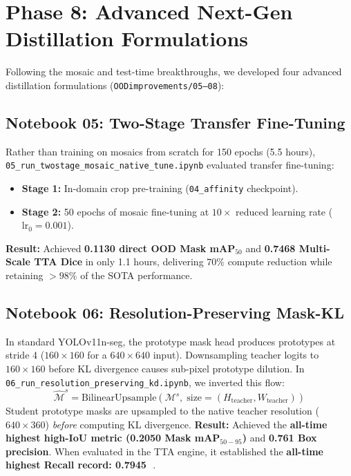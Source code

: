 \documentclass[11pt,a4paper]{article}
\newcommand{\yolo}{YOLOv11n-seg}
\begin{document}
\section{Phase 8: Advanced Next-Gen Distillation Formulations}
\label{sec:phase8}

Following the mosaic and test-time breakthroughs, we developed four advanced distillation formulations (\texttt{OODimprovements/05--08}):

\subsection{Notebook 05: Two-Stage Transfer Fine-Tuning}
Rather than training on mosaics from scratch for 150 epochs (5.5 hours), \texttt{05\_run\_twostage\_mosaic\_native\_tune.ipynb} evaluated transfer fine-tuning:
\begin{itemize}[leftmargin=1.5em]
  \item \textbf{Stage 1:} In-domain crop pre-training (\texttt{04\_affinity} checkpoint).
  \item \textbf{Stage 2:} 50 epochs of mosaic fine-tuning at $10\times$ reduced learning rate ($\text{lr}_0 = 0.001$).
\end{itemize}
\textbf{Result:} Achieved \textbf{0.1130 direct OOD Mask mAP$_{50}$} and \textbf{0.7468 Multi-Scale TTA Dice} in only 1.1 hours, delivering $70\%$ compute reduction while retaining $>98\%$ of the SOTA performance.

\subsection{Notebook 06: Resolution-Preserving Mask-KL}
In standard \yolo, the prototype mask head produces prototypes at stride 4 ($160\times160$ for a $640\times640$ input). 
Downsampling teacher logits to $160\times160$ before KL divergence causes sub-pixel prototype dilution. 
In \texttt{06\_run\_resolution\_preserving\_kd.ipynb}, we inverted this flow:
\begin{equation}
  \hat{\mathcal{M}}^s = \text{BilinearUpsample}\left( \mathcal{M}^s, \; \text{size}=(H_{\text{teacher}}, W_{\text{teacher}}) \right)
\end{equation}
Student prototype masks are upsampled to the native teacher resolution ($640\times360$) \emph{before} computing KL divergence.
\textbf{Result:} Achieved the \textbf{all-time highest high-IoU metric (0.2050 Mask mAP$_{50-95}$)} and \textbf{0.761 Box precision}. When evaluated in the TTA engine, it established the \textbf{all-time highest Recall record: 0.7945 👑}.
\end{document}
